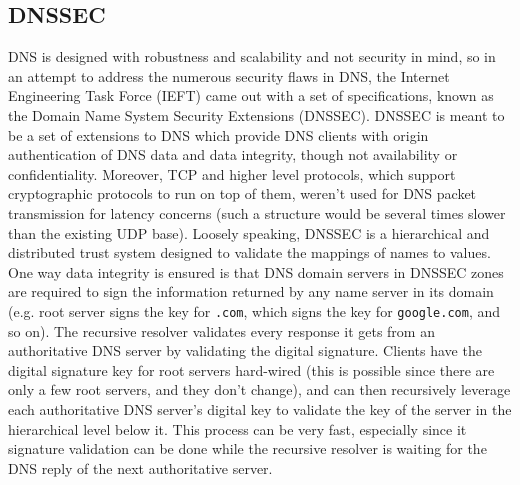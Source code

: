 \documentclass{article}
\begin{document}
\subsection{DNSSEC}
DNS is designed with robustness and scalability and not security in mind, so in an attempt to address the numerous security flaws in DNS, the Internet Engineering Task Force (IEFT) came out with a set of specifications, known as the Domain Name System Security Extensions (DNSSEC). DNSSEC is meant to be a set of extensions to DNS which provide DNS clients with origin authentication of DNS data and data integrity, though not availability or confidentiality. Moreover, TCP and higher level protocols, which support cryptographic protocols to run on top of them, weren't used for DNS packet transmission for latency concerns (such a structure would be several times slower than the existing UDP base). Loosely speaking, DNSSEC is a hierarchical and distributed trust system designed to validate the mappings of names to values. One way data integrity is ensured is that DNS domain servers in DNSSEC zones are required to sign the information returned by any name server in its domain (e.g. root server signs the key for \texttt{.com}, which signs the key for \texttt{google.com}, and so on). The recursive resolver validates every response it gets from an authoritative DNS server by validating the digital signature. Clients have the digital signature key for root servers hard-wired (this is possible since there are only a few root servers, and they don't change), and can then recursively leverage each authoritative DNS server's digital key to validate the key of the server in the hierarchical level below it.
\newline
This process can be very fast, especially since it signature validation can be done while the recursive resolver is waiting for the DNS reply of the next authoritative server.
\end{document}

